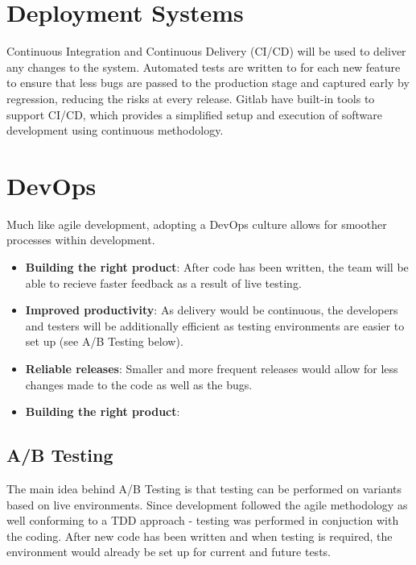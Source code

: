 \documentclass[12pt]{article}
\begin{document}
\section{Deployment Systems}
Continuous Integration and Continuous Delivery (CI/CD) will be used to deliver any changes to the system. Automated tests are written to for each new feature to ensure that less bugs are passed to the production stage and captured early by regression, reducing the risks at every release. Gitlab have built-in tools to support CI/CD, which provides a simplified setup and execution of software development using continuous methodology.

\section{DevOps}
Much like agile development, adopting a DevOps culture allows for smoother processes within development.
\begin{itemize}
    \item \textbf{Building the right product}: After code has been written, the team will be able to recieve faster feedback as a result of live testing.
    \item \textbf{Improved productivity}: As delivery would be continuous, the developers and testers will be additionally efficient as testing environments are easier to set up (see A/B Testing below).
    \item \textbf{Reliable releases}: Smaller and more frequent releases would allow for less changes made to the code as well as the bugs.
    \item \textbf{Building the right product}: 
\end{itemize}

\subsection{A/B Testing}
The main idea behind A/B Testing is that testing can be performed on variants based on live environments. Since development followed the agile methodology as well conforming to a TDD approach - testing was performed in conjuction with the coding. After new code has been written and when testing is required, the environment would already be set up for current and future tests.
\end{document}
